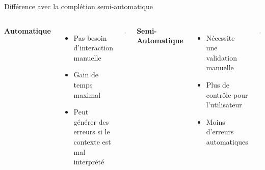 \begin{frame}{Différence avec la complétion semi-automatique}
	\begin{columns}
		\textbf{Automatique}
		\begin{itemize}
			\item Pas besoin d'interaction manuelle
			\item Gain de temps maximal
			\item Peut générer des erreurs si le contexte est mal interprété
		\end{itemize}
		\includegraphics[width=0.9\textwidth]{images/exemple_clavier_completion_auto.png}
		
		\textbf{Semi-Automatique}
		\begin{itemize}
			\item Nécessite une validation manuelle
			\item Plus de contrôle pour l'utilisateur
			\item Moins d’erreurs automatiques
		\end{itemize}
		\includegraphics[width=0.9\textwidth]{images/exemple_clavier_completion_semi.png}
	\end{columns}
\end{frame}

